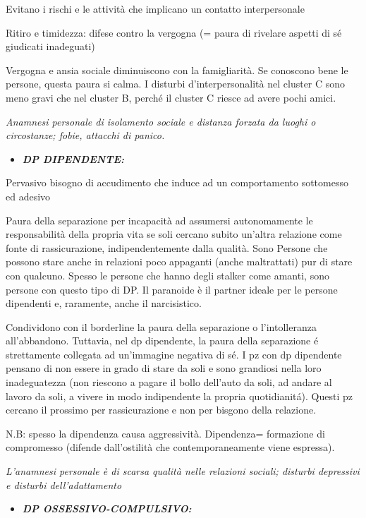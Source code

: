 \documentclass[]{article}
\begin{document}
Evitano i rischi e le attività che implicano un contatto interpersonale

Ritiro e timidezza: difese contro la vergogna (= paura di rivelare
aspetti di sé giudicati inadeguati)

Vergogna e ansia sociale diminuiscono con la famigliarità. Se conoscono
bene le persone, questa paura si calma. I disturbi d'interpersonalità
nel cluster C sono meno gravi che nel cluster B, perché il cluster C
riesce ad avere pochi amici.

\emph{\emph{Anamnesi personale di isolamento sociale e distanza forzata
da luoghi o circostanze; fobie, attacchi di panico. }}

\begin{itemize}
\item
  \textbf{\emph{DP DIPENDENTE:}}
\end{itemize}

Pervasivo bisogno di accudimento che induce ad un comportamento
sottomesso ed adesivo

Paura della separazione per incapacità ad assumersi autonomamente le
responsabilità della propria vita se soli cercano subito un'altra
relazione come fonte di rassicurazione, indipendentemente dalla qualità.
Sono Persone che possono stare anche in relazioni poco appaganti (anche
maltrattati) pur di stare con qualcuno. Spesso le persone che hanno
degli stalker come amanti, sono persone con questo tipo di DP. Il
paranoide è il partner ideale per le persone dipendenti e, raramente,
anche il narcisistico.

Condividono con il borderline la paura della separazione o
l'intolleranza all'abbandono. Tuttavia, nel dp dipendente, la paura
della separazione é strettamente collegata ad un'immagine negativa di
sé. I pz con dp dipendente pensano di non essere in grado di stare da
soli e sono grandiosi nella loro inadeguatezza (non riescono a pagare il
bollo dell'auto da soli, ad andare al lavoro da soli, a vivere in modo
indipendente la propria quotidianitá). Questi pz cercano il prossimo per
rassicurazione e non per bisgono della relazione.

N.B: spesso la dipendenza causa aggressività. Dipendenza= formazione di
compromesso (difende dall'ostilità che contemporaneamente viene
espressa).

\emph{\emph{L'anamnesi personale è di scarsa qualità nelle relazioni
sociali; disturbi depressivi e disturbi dell'adattamento}}

\begin{itemize}
\item
  \textbf{\emph{DP OSSESSIVO-COMPULSIVO:}}
\end{itemize}
\end{document}
